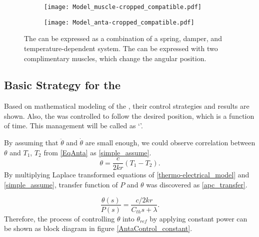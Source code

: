 \begin{figure}[t]
	\centering
	\begin{subfigure}[t]{0.2\textwidth}
		\centering\texttt{[image: Model\_muscle-cropped\_compatible.pdf]}
		\caption{\label{ModelMus}}
	\end{subfigure}
	\begin{subfigure}[t]{0.31\textwidth}
		\centering\texttt{[image: Model\_anta-cropped\_compatible.pdf]}
		\caption{\label{ModelAnt}}
	\end{subfigure}
	\caption[Modeling of the \scps and \anta]{ The \scps can be expressed as a combination of a spring, damper, and temperature-dependent system.  The \anta can be expressed with two complimentary muscles, which change the angular position.}
	\label{model}
\end{figure}



\subsection{Basic Strategy for the \APC}

Based on mathematical modeling of the \scpsnospace, their control strategies and results are shown. Also, the \anta was controlled to follow the desired position, which is a function of time. This management will be called as `\apcnospace'.

By assuming that $\ddot{\theta}$ and $\dot{\theta}$ are small enough, we could observe correlation between $\theta$ and $T_{1}$, $T_{2}$ from \eqref{EqAnta} as \eqref{simple_assume}.
\begin{equation} \label{simple_assume}
\theta = \frac{c}{2kr}(T_{1}-T_{2}).
\end{equation}
By multiplying Laplace transformed equations of \eqref{thermo-electrical_model} and \eqref{simple_assume}, transfer function of $P$ and $\theta$ was discovered as \eqref{apc_transfer}.

\begin{equation} \label{apc_transfer}
\frac{\theta(s)}{P(s)} = \frac{c/2kr}{C_{th}s+\lambda}.
\end{equation}
Therefore, the process of controlling $\theta$ into $\theta_{ref}$ by applying constant power can be shown as block diagram in figure \ref{AntaControl_constant}. 

